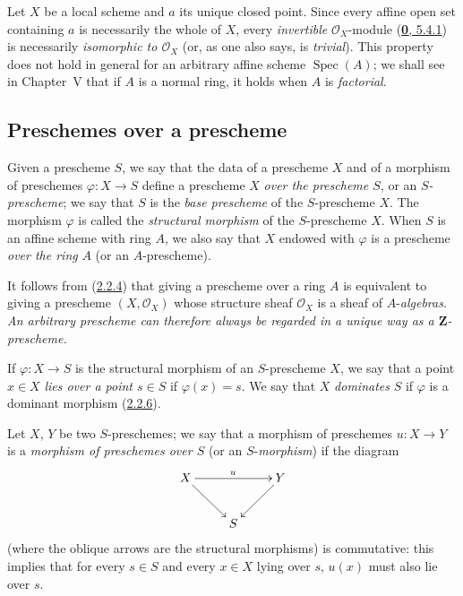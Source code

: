 \begin{remark}[2.4.8]
\label{I.2.4.8}
Let $X$ be a local scheme and $a$ its unique closed point. Since every
affine open set containing $a$ is necessarily the whole of $X$, every
\emph{invertible} $\mathscr{O}_X$-module
(\hyperref[0.5.4.1]{\textbf{0}, 5.4.1}) is necessarily \emph{isomorphic to
$\mathscr{O}_X$} (or, as one also says, is \emph{trivial}). This property
does not hold in general for an arbitrary affine scheme
$\operatorname{Spec}(A)$; we shall see in Chapter~V that if $A$ is a normal
ring, it holds when $A$ is \emph{factorial}.
\end{remark}

\subsection{Preschemes over a prescheme}
\label{subsection:I.2.5}

\begin{definition}[2.5.1]
\label{I.2.5.1}
Given a prescheme $S$, we say that the data of a prescheme $X$ and of a
morphism of preschemes $\varphi:X\to S$ define a prescheme $X$ \emph{over
the prescheme $S$}, or an \emph{$S$-prescheme}; we say that $S$ is the
\emph{base prescheme} of the $S$-prescheme $X$. The morphism $\varphi$ is
called the \emph{structural morphism} of the $S$-prescheme $X$. When $S$ is
an affine scheme with ring $A$, we also say that $X$ endowed with $\varphi$
is a prescheme \emph{over the ring} $A$ (or an $A$-prescheme).
\end{definition}

It follows from (\hyperref[I.2.2.4]{2.2.4}) that giving a prescheme
over a ring $A$ is equivalent to giving a prescheme
$(X,\mathscr{O}_X)$ whose structure sheaf $\mathscr{O}_X$ is a sheaf
of $A$-\emph{algebras}. \emph{An arbitrary prescheme can therefore always be
regarded in a unique way as a $\mathbf{Z}$-prescheme.}

If $\varphi:X\to S$ is the structural morphism of an $S$-prescheme $X$, we
say that a point $x\in X$ \emph{lies over a point $s\in S$} if
$\varphi(x)=s$. We say that $X$ \emph{dominates} $S$ if $\varphi$ is a
dominant morphism (\hyperref[I.2.2.6]{2.2.6}).

\begin{env}[2.5.2]
\label{I.2.5.2}
Let $X$, $Y$ be two $S$-preschemes; we say that a morphism of preschemes
$u:X\to Y$ is a \emph{morphism of preschemes over $S$} (or an
$S$-\emph{morphism}) if the diagram
\label{I.2.5.2.diagram}
\[
  \xymatrix{
    X\ar[rr]^u\ar[dr] & & Y\ar[dl]\\
    & S &
  }
\]
(where the oblique arrows are the structural morphisms) is commutative:
this implies that for every $s\in S$ and every $x\in X$ lying over $s$,
$u(x)$ must also lie over $s$.
\end{env}


